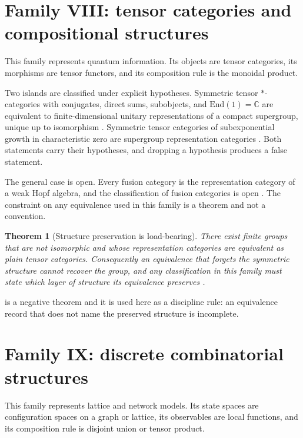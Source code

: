 \documentclass[11pt,letterpaper]{article}
\newtheorem{theorem}{Theorem}[section]
\theoremstyle{definition}
\theoremstyle{remark}
\begin{document}
\section{Family VIII: tensor categories and compositional structures}
\label{sec:family8}

This family represents quantum information. Its objects are tensor categories, its morphisms are tensor functors, and its composition rule is the monoidal product.

Two islands are classified under explicit hypotheses. Symmetric tensor $*$-categories with conjugates, direct sums, subobjects, and $\mathrm{End}(1) = \mathbb{C}$ are equivalent to finite-dimensional unitary representations of a compact supergroup, unique up to isomorphism \cite{dr,dhr}. Symmetric tensor categories of subexponential growth in characteristic zero are supergroup representation categories \cite{deligne}. Both statements carry their hypotheses, and dropping a hypothesis produces a false statement.

The general case is open. Every fusion category is the representation category of a weak Hopf algebra, and the classification of fusion categories is open \cite{fusion}. The constraint on any equivalence used in this family is a theorem and not a convention.

\begin{theorem}[Structure preservation is load-bearing]
\label{thm:etingof-gelaki}
There exist finite groups that are not isomorphic and whose representation categories are equivalent as plain tensor categories. Consequently an equivalence that forgets the symmetric structure cannot recover the group, and any classification in this family must state which layer of structure its equivalence preserves \cite{etingof}.
\end{theorem}

 is a negative theorem and it is used here as a discipline rule: an equivalence record that does not name the preserved structure is incomplete.

\section{Family IX: discrete combinatorial structures}
\label{sec:family9}

This family represents lattice and network models. Its state spaces are configuration spaces on a graph or lattice, its observables are local functions, and its composition rule is disjoint union or tensor product.
\end{document}
